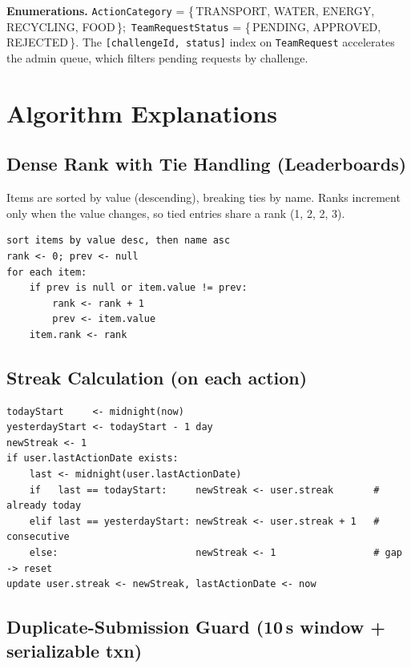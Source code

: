 \documentclass[11pt]{article}
\begin{document}
\noindent\textbf{Enumerations.}
\texttt{ActionCategory} = \{\,TRANSPORT, WATER, ENERGY, RECYCLING, FOOD\,\};\
\texttt{TeamRequestStatus} = \{\,PENDING, APPROVED, REJECTED\,\}. The
\texttt{[challengeId, status]} index on \texttt{TeamRequest} accelerates the
admin queue, which filters pending requests by challenge.

\section{Algorithm Explanations}

\subsection{Dense Rank with Tie Handling (Leaderboards)}

Items are sorted by value (descending), breaking ties by name. Ranks increment
only when the value changes, so tied entries share a rank (1, 2, 2, 3).

\begin{verbatim}
sort items by value desc, then name asc
rank <- 0; prev <- null
for each item:
    if prev is null or item.value != prev:
        rank <- rank + 1
        prev <- item.value
    item.rank <- rank
\end{verbatim}

\subsection{Streak Calculation (on each action)}

\begin{verbatim}
todayStart     <- midnight(now)
yesterdayStart <- todayStart - 1 day
newStreak <- 1
if user.lastActionDate exists:
    last <- midnight(user.lastActionDate)
    if   last == todayStart:     newStreak <- user.streak       # already today
    elif last == yesterdayStart: newStreak <- user.streak + 1   # consecutive
    else:                        newStreak <- 1                 # gap -> reset
update user.streak <- newStreak, lastActionDate <- now
\end{verbatim}

\subsection{Duplicate-Submission Guard (10\,s window + serializable txn)}
\end{document}
